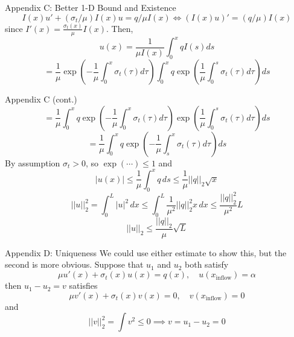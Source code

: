 \documentclass{beamer}
\newcommand{\lt}{\left}
\newcommand{\rt}{\right}
\theoremstyle{plain}
\theoremstyle{definition}
\begin{document}
\begin{frame}{Appendix C: Better 1-D Bound and Existence}
    \[
    I(x)u' + (\sigma_t/\mu) I(x) u = q/\mu I(x) \Longleftrightarrow (I(x)u)' = (q/\mu)I(x)
    \]
    since $I'(x) = \frac{\sigma_t(x)}{\mu}I(x)$. Then, \[
 u(x) = \frac{1}{\mu I(x)} \int_0^x q I(s) ds
\]
\[
= \frac{1}{\mu} \exp\lt(-\frac{1}{\mu} \int_0^x \sigma_t(\tau) d\tau \rt) \int_0^x q \exp\lt(\frac{1}{\mu} \int_0^s \sigma_t(\tau) d\tau\rt) d s
\]
\end{frame}
\begin{frame}{Appendix C (cont.)}
\[
= \frac{1}{\mu}  \int_0^x q \exp\lt(-\frac{1}{\mu} \int_0^x \sigma_t(\tau) d\tau \rt)\exp\lt(\frac{1}{\mu} \int_0^s \sigma_t(\tau) d\tau\rt) d s
\]
\[
= \frac{1}{\mu}  \int_0^x q \exp\lt(-\frac{1}{\mu} \int_s^x \sigma_t(\tau) d\tau\rt) d s
\]
By assumption $\sigma_t > 0 $, so $\exp(\cdots) \leq 1$ and \[ |u(x)| \leq \frac{1}{\mu} \int_0^x q  \, ds  \leq \frac{1}{\mu} ||q||_2 \sqrt x \]
\[
||u||_2^2 = \int_0^L |u|^2 \, dx \leq \int_0^L \frac{1}{\mu^2} ||q||_2^2 x\, dx \leq \frac{||q||_2^2}{\mu^2}L\]
\[
||u||_2 \leq \frac{||q||_2}{\mu} \sqrt{L}
\]
\end{frame}

\begin{frame}{Appendix D: Uniqueness}
 We could use either estimate to show this, but the second is more obvious. Suppose that $u_1$ and $u_2$ both satisfy \[
 \mu u'(x) + \sigma_t(x) u(x) = q(x), \quad u(x_{\text{inflow}} ) = \alpha
 \]
 then $u_1 -u_2 = v$ satisfies \[
 \mu v'(x) + \sigma_t(x) v(x) = 0, \quad v(x_{\text{inflow}}) = 0 
 \]
 and
 \[
 ||v||_2^2 = \int v^2 \leq 0 \implies v = u_1 - u_2 = 0
 \]
\end{frame}
\end{document}

